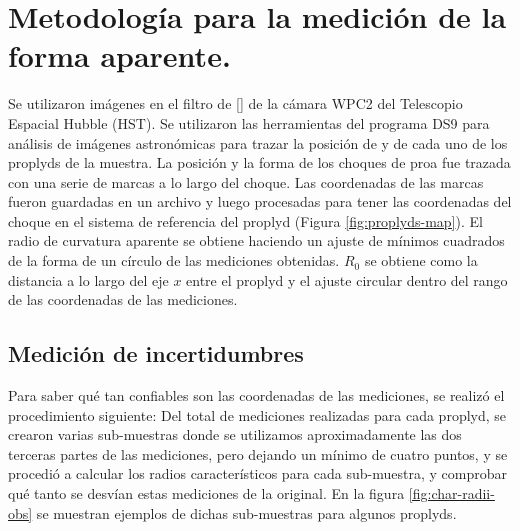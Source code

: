 \section{Metodología para la medición de la forma aparente.}
\label{sec:methodology}
Se utilizaron imágenes en el filtro de [] de la cámara WPC2 del Telescopio Espacial Hubble (HST). Se utilizaron las herramientas del programa DS9 para análisis de imágenes astronómicas para trazar la posición de \thC{} y de cada uno de los proplyds de la muestra. La posición y la forma de los choques de proa fue trazada con una serie de marcas a lo largo del choque. Las coordenadas de las marcas fueron guardadas en un archivo y luego procesadas para tener las coordenadas del choque en el sistema de referencia del proplyd (Figura \ref{fig:proplyds-map}). El radio de curvatura aparente se obtiene haciendo un ajuste de mínimos cuadrados de la forma de un círculo de las mediciones obtenidas. $R_0$ se obtiene como la distancia a lo largo del eje $x$ entre el proplyd y el ajuste circular dentro del rango de las coordenadas de las mediciones. 

\subsection{Medición de incertidumbres}

Para saber qué tan confiables son las coordenadas de las mediciones, se realizó el procedimiento siguiente: Del total de mediciones realizadas para cada proplyd, se crearon varias sub-muestras donde se utilizamos aproximadamente las dos terceras partes de las mediciones, pero dejando un mínimo de cuatro puntos, y se procedió a calcular los radios característicos para cada sub-muestra, y comprobar qué tanto se desvían estas mediciones de la original. En la figura \ref{fig:char-radii-obs} se muestran ejemplos de dichas sub-muestras para algunos proplyds.


